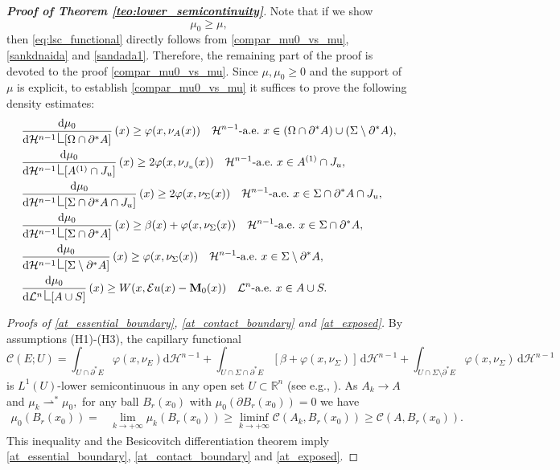 \documentclass[reqno]{amsart}
\numberwithin{equation}{section}
\theoremstyle{plain}
\theoremstyle{definition}
\newcommand{\R}{\mathbb{R}}
\newcommand{\bM}{\mathbf{M}}
\newcommand{\cH}{\mathcal{H}}
\newcommand{\cL}{\mathcal{L}}
\newcommand{\p}{\partial}
\newcommand{\wk}{\rightharpoonup}
\renewcommand{\d}{\mathrm{d}}
\newcommand{\res}{\mathop{\hbox{\vrule height 9pt width 0.5pt depth 0pt
\vrule height 0.5pt width 5pt depth 0pt}}\nolimits}
\newcommand{\str}[1]{\mathcal{E}#1}
\newcommand{\substrate}{S}
\begin{document}
\begin{proof}[\textbf{Proof of Theorem \ref{teo:lower_semicontinuity}}]
Note that if we show
\begin{equation}\label{compar_mu0_vs_mu}
\mu_0\ge\mu,
\end{equation}
%
then \eqref{eq:lsc_functional} directly follows from \eqref{compar_mu0_vs_mu}, \eqref{sankdnaida} and \eqref{sandada1}.
Therefore, the remaining part of the proof is devoted to the proof \eqref{compar_mu0_vs_mu}. Since $\mu,\mu_0\ge0$ and the support of $\mu$ is explicit, to establish \eqref{compar_mu0_vs_mu} it suffices to prove  the following density estimates:
%
\begin{subequations}
\begin{align}
& \frac{\d\mu_0}{\d\cH^{n-1}\res[ \Omega\cap \p^*A ]}\,(x) \ge \varphi(x,\nu_A(x))\quad\text{$\cH^{n-1}$-a.e.\  $x\in (\Omega\cap\p^*A)\cup (\Sigma\setminus \p^*A),$} \label{at_essential_boundary}\\
%
& \frac{\d\mu_0}{\d\cH^{n-1}\res [A^{(1)}\cap J_u]}\,(x) \ge 2\varphi(x,\nu_{J_u}(x)) \quad\text{$\cH^{n-1}$-a.e.\  $x\in A^{(1)}\cap J_u,$} \label{at_internal_crack}\\
%
& \frac{\d\mu_0}{\d\cH^{n-1}\res [\Sigma\cap \p^*A\cap J_u]}\,(x) \ge 2\varphi(x,\nu_\Sigma(x)) \quad\text{$\cH^{n-1}$-a.e.\  $x\in \Sigma\cap \p^*A\cap J_u,$} \label{at_delamination}\\
%
& \frac{\d\mu_0}{\d\cH^{n-1}\res [\Sigma\cap \p^*A]}\,(x) \ge \beta(x) + \varphi(x,\nu_\Sigma(x))\quad\text{$\cH^{n-1}$-a.e.\  $x\in \Sigma\cap\p^*A,$} \label{at_contact_boundary}\\
%
& \frac{\d\mu_0}{\d\cH^{n-1}\res [\Sigma\setminus  \p^*A]}\,(x) \ge \varphi(x,\nu_\Sigma(x))\quad\text{$\cH^{n-1}$-a.e.\  $x\in \Sigma\setminus\p^*A,$} \label{at_exposed}\\
%
&\frac{\d\mu_0}{\d\cL^n\res [A\cup \substrate]}\,(x) \ge W(x,\str{u}(x)-\bM_0(x))\quad\text{$\cL^n$-a.e.\  $x\in A\cup \substrate.$} \label{at_bulk}
\end{align}
\end{subequations}
%
\smallskip 

{\it Proofs of \eqref{at_essential_boundary},  \eqref{at_contact_boundary} and \eqref{at_exposed}.} 
By assumptions (H1)-(H3), the capillary functional
$$
\mathcal{C}(E;U) = \int_{U\cap \p^*E} \varphi(x,\nu_E)\d \cH^{n-1} + \int_{U\cap \Sigma\cap \p^*E} [\beta + \varphi(x,\nu_\Sigma)]\,\d\cH^{n-1} + \int_{U\cap \Sigma\setminus \p^*E} \varphi(x,\nu_\Sigma)\,\d\cH^{n-1}
$$ 
is $L^1(U)$-lower semicontinuous in any open set $U\subset\R^n$ (see e.g., \cite[Theorem 3.4]{ADT:2017}). As $A_k\to A$ and $\mu_k\wk^*\mu_0,$ for any ball  $B_r(x_0)$ with $\mu_0(\p B_r(x_0))=0$ we have
%
\begin{align*}
\mu_0(B_r(x_0)) = &  \lim\limits_{k\to+\infty} \mu_k(B_r(x_0))
\ge \liminf\limits_{k\to+\infty} \mathcal{C}(A_k, B_r(x_0)) \ge \mathcal{C}(A, B_r(x_0)).
\end{align*}
This inequality and the Besicovitch differentiation theorem imply  \eqref{at_essential_boundary},  \eqref{at_contact_boundary} and \eqref{at_exposed}.  
\smallskip



\end{proof}
\end{document}

